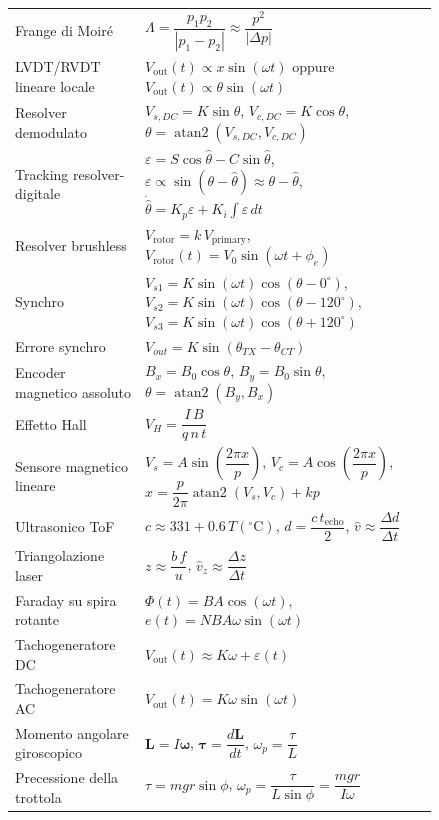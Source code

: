 \documentclass[11pt,a4paper]{article}
\begin{document}
{\begin{longtable}{>{\raggedright\arraybackslash}p{0.24\linewidth}>{\raggedright\arraybackslash}p{0.60\linewidth}}
Frange di Moir\'e & $\Lambda=\dfrac{p_1p_2}{|p_1-p_2|}\approx\dfrac{p^2}{|\Delta p|}$ \\
LVDT/RVDT lineare locale & $V_{\text{out}}(t)\propto x\sin(\omega t)$ oppure $V_{\text{out}}(t)\propto \theta\sin(\omega t)$ \\
Resolver demodulato & $V_{s,DC}=K\sin\theta$, \quad $V_{c,DC}=K\cos\theta$, \quad $\theta=\operatorname{atan2}(V_{s,DC},V_{c,DC})$ \\
Tracking resolver-digitale & $\varepsilon=S\cos\hat\theta-C\sin\hat\theta$, \quad $\varepsilon \propto \sin(\theta-\hat\theta)\approx \theta-\hat\theta$, \quad $\dot{\hat\theta}=K_p\varepsilon+K_i\int \varepsilon\,dt$ \\
Resolver brushless & $V_{\text{rotor}}=k\,V_{\text{primary}}$, \quad $V_{\text{rotor}}(t)=V_0\sin(\omega t+\phi_e)$ \\
Synchro & $V_{s1}=K\sin(\omega t)\cos(\theta-0^\circ)$, \quad $V_{s2}=K\sin(\omega t)\cos(\theta-120^\circ)$, \quad $V_{s3}=K\sin(\omega t)\cos(\theta+120^\circ)$ \\
Errore synchro & $V_{out}=K\sin(\theta_{TX}-\theta_{CT})$ \\
Encoder magnetico assoluto & $B_x=B_0\cos\theta$, \quad $B_y=B_0\sin\theta$, \quad $\theta=\operatorname{atan2}(B_y,B_x)$ \\
Effetto Hall & $V_H=\dfrac{I\,B}{q\,n\,t}$ \\
Sensore magnetico lineare & $V_s=A\sin\!\left(\dfrac{2\pi x}{p}\right)$, \quad $V_c=A\cos\!\left(\dfrac{2\pi x}{p}\right)$, \quad $x=\dfrac{p}{2\pi}\operatorname{atan2}(V_s,V_c)+kp$ \\
Ultrasonico ToF & $c \approx 331 + 0.6\,T(^\circ\text{C})$, \quad $d=\dfrac{c\,t_{\text{echo}}}{2}$, \quad $\hat v \approx \dfrac{\Delta d}{\Delta t}$ \\
Triangolazione laser & $z \approx \dfrac{b\,f}{u}$, \quad $\hat v_z \approx \dfrac{\Delta z}{\Delta t}$ \\
Faraday su spira rotante & $\Phi(t)=BA\cos(\omega t)$, \quad $e(t)=NBA\omega\sin(\omega t)$ \\
Tachogeneratore DC & $V_{\text{out}}(t)\approx K\omega + \varepsilon(t)$ \\
Tachogeneratore AC & $V_{\text{out}}(t)=K\omega\sin(\omega t)$ \\
Momento angolare giroscopico & $\mathbf{L}=I\boldsymbol{\omega}$, \quad $\boldsymbol{\tau}=\dfrac{d\mathbf{L}}{dt}$, \quad $\omega_p=\dfrac{\tau}{L}$ \\
Precessione della trottola & $\tau=mgr\sin\phi$, \quad $\omega_p=\dfrac{\tau}{L\sin\phi}=\dfrac{mgr}{I\omega}$ \\

\end{longtable}}
\end{document}
